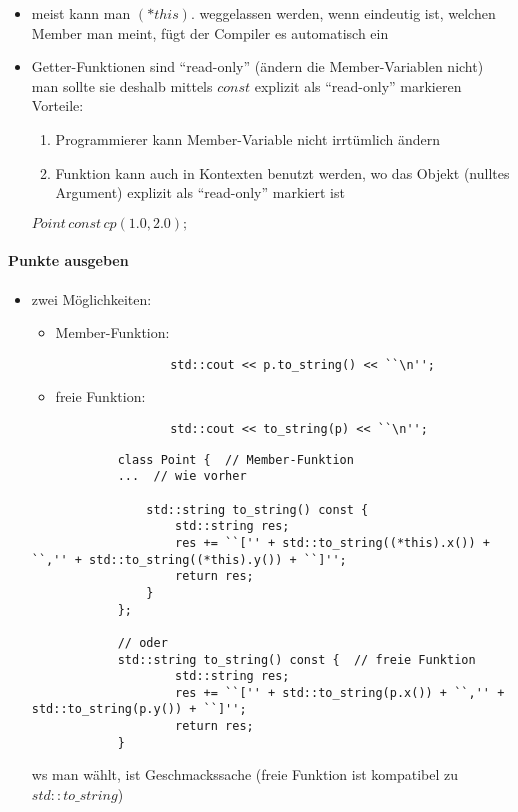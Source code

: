 \documentclass{article}
\begin{document}
	 \begin{itemize}
	 	\item meist kann man $(*this).$ weggelassen werden, wenn eindeutig ist, welchen Member man meint, fügt der Compiler es automatisch ein
	 	\item Getter-Funktionen sind ``read-only'' (ändern die Member-Variablen nicht) \\
	 	man sollte sie deshalb mittels $const$ explizit als ``read-only'' markieren \\ Vorteile:
	 	\begin{enumerate}
	 		\item Programmierer kann Member-Variable nicht irrtümlich ändern
	 		\item Funktion kann auch in Kontexten benutzt werden, wo das Objekt (nulltes Argument) explizit als ``read-only'' markiert ist
	 	\end{enumerate}
	 	$Point \, const \, cp(1.0,2.0);$
	 \end{itemize}

\paragraph{Punkte ausgeben}

	\begin{itemize}
		\item zwei Möglichkeiten:
		\begin{itemize}
			\item Member-Funktion:
			\begin{lstlisting}
				std::cout << p.to_string() << ``\n'';
			\end{lstlisting}
			\item freie Funktion:
			\begin{lstlisting}
				std::cout << to_string(p) << ``\n'';
			\end{lstlisting}
		\end{itemize}
		\begin{lstlisting}
			class Point {  // Member-Funktion
			...  // wie vorher

				std::string to_string() const {
					std::string res;
					res += ``['' + std::to_string((*this).x()) + ``,'' + std::to_string((*this).y()) + ``]'';
					return res;
				}
			};

			// oder
			std::string to_string() const {  // freie Funktion
					std::string res;
					res += ``['' + std::to_string(p.x()) + ``,'' + std::to_string(p.y()) + ``]'';
					return res;
			}
		\end{lstlisting}
		ws man wählt, ist Geschmackssache (freie Funktion ist kompatibel zu $std::to\_string$)
	\end{itemize}
\end{document}
